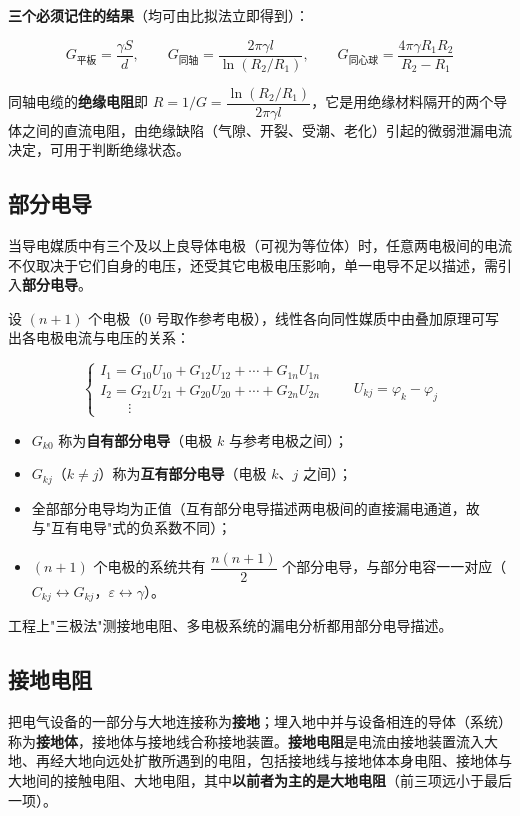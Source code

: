 \textbf{三个必须记住的结果}（均可由比拟法立即得到）：
\begin{formulaBox}
\[
G_{\text{平板}}=\frac{\gamma S}{d},\qquad
G_{\text{同轴}}=\frac{2\pi\gamma l}{\ln(R_2/R_1)},\qquad
G_{\text{同心球}}=\frac{4\pi\gamma R_1R_2}{R_2-R_1}
\]
\end{formulaBox}
同轴电缆的\textbf{绝缘电阻}即 $R=1/G=\dfrac{\ln(R_2/R_1)}{2\pi\gamma l}$，它是用绝缘材料隔开的两个导体之间的直流电阻，由绝缘缺陷（气隙、开裂、受潮、老化）引起的微弱泄漏电流决定，可用于判断绝缘状态。

\subsection{部分电导}
当导电媒质中有三个及以上良导体电极（可视为等位体）时，任意两电极间的电流不仅取决于它们自身的电压，还受其它电极电压影响，单一电导不足以描述，需引入\textbf{部分电导}。

设 $(n+1)$ 个电极（0 号取作参考电极），线性各向同性媒质中由叠加原理可写出各电极电流与电压的关系：
\begin{formulaBox}
\[
\begin{cases}
I_1=G_{10}U_{10}+G_{12}U_{12}+\cdots+G_{1n}U_{1n}\\
I_2=G_{21}U_{21}+G_{20}U_{20}+\cdots+G_{2n}U_{2n}\\
\qquad\vdots
\end{cases}
\qquad U_{kj}=\varphi_k-\varphi_j
\]
\end{formulaBox}
\begin{itemize}
  \item $G_{k0}$ 称为\textbf{自有部分电导}（电极 $k$ 与参考电极之间）；
  \item $G_{kj}$（$k\neq j$）称为\textbf{互有部分电导}（电极 $k$、$j$ 之间）；
  \item 全部部分电导均为正值（互有部分电导描述两电极间的直接漏电通道，故与"互有电导"式的负系数不同）；
  \item $(n+1)$ 个电极的系统共有 $\dfrac{n(n+1)}{2}$ 个部分电导，与部分电容一一对应（$C_{kj}\leftrightarrow G_{kj}$，$\varepsilon\leftrightarrow\gamma$）。
\end{itemize}
工程上"三极法"测接地电阻、多电极系统的漏电分析都用部分电导描述。

\subsection{接地电阻}
把电气设备的一部分与大地连接称为\textbf{接地}；埋入地中并与设备相连的导体（系统）称为\textbf{接地体}，接地体与接地线合称接地装置。\textbf{接地电阻}是电流由接地装置流入大地、再经大地向远处扩散所遇到的电阻，包括接地线与接地体本身电阻、接地体与大地间的接触电阻、大地电阻，其中\textbf{以前者为主的是大地电阻}（前三项远小于最后一项）。


